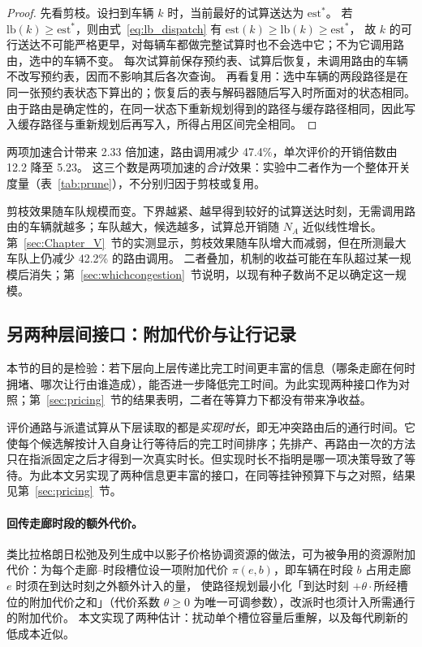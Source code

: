 \documentclass[manuscript,screen,review]{acmart}
\newcommand{\RouteCallCutLo}{42.2\%}     %
\newcommand{\SpeedupProbe}{2.33}
\newcommand{\RouteCallCut}{47.4\%}
\newcommand{\CostMultBefore}{12.2}
\newcommand{\CostMultAfter}{5.23}
\begin{document}
\begin{proof}
  先看剪枝。设扫到车辆 $k$ 时，当前最好的试算送达为 $\mathrm{est}^{\ast}$。
  若 $\mathrm{lb}(k)\ge \mathrm{est}^{\ast}$，则由式~\eqref{eq:lb_dispatch} 有
  $\mathrm{est}(k)\ge\mathrm{lb}(k)\ge\mathrm{est}^{\ast}$，
  故 $k$ 的可行送达不可能严格更早，对每辆车都做完整试算时也不会选中它；不为它调用路由，选中的车辆不变。
  每次试算前保存预约表、试算后恢复，未调用路由的车辆不改写预约表，因而不影响其后各次查询。
  再看复用：选中车辆的两段路径是在同一张预约表状态下算出的；恢复后的表与解码器随后写入时所面对的状态相同。
  由于路由是确定性的，在同一状态下重新规划得到的路径与缓存路径相同，因此写入缓存路径与重新规划后再写入，所得占用区间完全相同。
\end{proof}

两项加速合计带来 \SpeedupProbe{} 倍加速，路由调用减少 \RouteCallCut{}，单次评价的开销倍数由 \CostMultBefore{} 降至 \CostMultAfter{}。
这三个数是两项加速的\emph{合计}效果：实验中二者作为一个整体开关度量（表~\ref{tab:prune}），不分别归因于剪枝或复用。

剪枝效果随车队规模而变。下界越紧、越早得到较好的试算送达时刻，无需调用路由的车辆就越多；车队越大，候选越多，试算总开销随 $N_A$ 近似线性增长。
第~\ref{sec:Chapter_V}~节的实测显示，剪枝效果随车队增大而减弱，但在所测最大车队上仍减少 \RouteCallCutLo{} 的路由调用。
二者叠加，机制的收益可能在车队超过某一规模后消失；第~\ref{sec:whichcongestion}~节说明，以现有种子数尚不足以确定这一规模。

\subsection{另两种层间接口：附加代价与让行记录}
\label{sec:interface}

本节的目的是检验：若下层向上层传递比完工时间更丰富的信息（哪条走廊在何时拥堵、哪次让行由谁造成），能否进一步降低完工时间。为此实现两种接口作为对照；第~\ref{sec:pricing}~节的结果表明，二者在等算力下都没有带来净收益。

评价通路与派遣试算从下层读取的都是\emph{实现时长}，即无冲突路由后的通行时间。它使每个候选解按计入自身让行等待后的完工时间排序；先排产、再路由一次的方法只在指派固定之后才得到一次真实时长。但实现时长不指明是哪一项决策导致了等待。为此本文另实现了两种信息更丰富的接口，在同等挂钟预算下与之对照，结果见第~\ref{sec:pricing}~节。

\paragraph{回传走廊时段的额外代价。}
类比拉格朗日松弛及列生成中以影子价格协调资源的做法，可为被争用的资源附加代价：为每个走廊--时段槽位设一项附加代价 $\pi(e,b)$，即车辆在时段 $b$ 占用走廊 $e$ 时须在到达时刻之外额外计入的量，
使路径规划最小化「到达时刻 $+\theta\cdot$所经槽位的附加代价之和」（代价系数 $\theta\ge0$ 为唯一可调参数），改派时也须计入所需通行的附加代价。
本文实现了两种估计：扰动单个槽位容量后重解，以及每代刷新的低成本近似。
\end{document}
